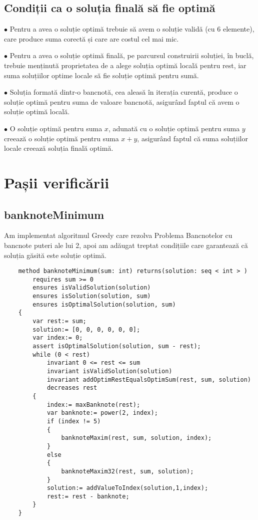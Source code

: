     \subsection{Condiții ca o soluția finală să fie optimă}
    $\bullet$ Pentru a avea o soluție optimă trebuie să avem o soluție validă (cu 6 elemente), care produce suma corectă
     și care are costul cel mai mic.\par
    $\bullet$ Pentru a avea o soluție optimă finală, pe parcursul construirii soluției, în buclă, trebuie menținută proprietatea
     de a alege soluția optimă locală pentru rest, iar suma soluțiilor optime locale să fie soluție optimă pentru sumă.\par
    $\bullet$ Soluția formată dintr-o bancnotă, cea aleasă în iterația curentă, produce o soluție optimă pentru suma 
    de valoare bancnotă, asigurând faptul că avem o soluție optimă locală.\par
    $\bullet$ O soluție optimă pentru suma $x$, adunată cu o soluție optimă pentru suma $y$ creează o soluție optimă pentru suma $x+y$, 
    asigurând faptul că suma soluțiilor locale creează soluția finală optimă.\par
    
\section{Pașii verificării}
    \subsection{banknoteMinimum}
    Am implementat algoritmul Greedy care rezolva Problema Bancnotelor cu bancnote puteri ale lui 2, 
    apoi am adăugat treptat condițiile care garantează că soluția găsită este soluție optimă.\par
    \begin{lstlisting}
    method banknoteMinimum(sum: int) returns(solution: seq < int > )
        requires sum >= 0
        ensures isValidSolution(solution)
        ensures isSolution(solution, sum)
        ensures isOptimalSolution(solution, sum) 
    {
        var rest:= sum;
        solution:= [0, 0, 0, 0, 0, 0];
        var index:= 0;
        assert isOptimalSolution(solution, sum - rest);
        while (0 < rest)
            invariant 0 <= rest <= sum
            invariant isValidSolution(solution)
            invariant addOptimRestEqualsOptimSum(rest, sum, solution)
            decreases rest 
        {
            index:= maxBanknote(rest);
            var banknote:= power(2, index);
            if (index != 5) 
            {
                banknoteMaxim(rest, sum, solution, index);
            } 
            else 
            {
                banknoteMaxim32(rest, sum, solution);
            }
            solution:= addValueToIndex(solution,1,index);
            rest:= rest - banknote;
        }
    }
    \end{lstlisting}
